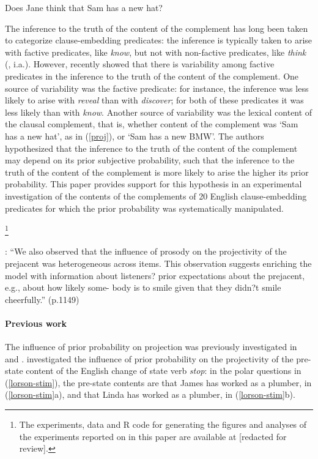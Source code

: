 \documentclass[11pt,fleqn]{article}
\newcommand{\6}{\mbox{$[\hspace*{-.6mm}[$}}
\newcommand{\9}{\mbox{$]\hspace*{-.6mm}]$}}
\begin{document}
\begin{exe}
\ex\label{proj2} Does Jane think that Sam has a new hat?
\end{exe}
The inference to the truth of the content of the complement has long been taken to categorize clause-embedding predicates: the inference is typically taken to arise with factive predicates, like {\em know}, but not with non-factive predicates, like {\em think} (\citealt{kiparsky-kiparsky70,karttunen71b}, i.a.). However, \citealt*{tbd-variability} recently showed that there is variability among factive predicates in the inference to the truth of the content of the complement. One source of variability was the factive predicate: for instance, the inference was less likely to arise with {\em reveal} than with {\em discover}; for both of these predicates it was less likely than with {\em know}. Another source of variability was the lexical content of the clausal complement, that is, whether content of the complement was `Sam has a new hat', as in (\ref{proj}), or `Sam has a new BMW'. The authors hypothesized that the inference to the truth of the content of the complement may depend on its prior subjective probability, such that the inference to the truth of the content of the complement is more likely to arise the higher its prior probability. This paper provides support for this hypothesis in an experimental investigation of the contents of the complements of 20 English clause-embedding predicates for which the prior probability was systematically manipulated. 

\footnote{\label{f-github}The experiments, data and R code for generating the figures and analyses of the experiments reported on in this paper are available at [redacted for review].}

\citealt{stevens-etal2017}: ``We also observed that the influence of prosody on the projectivity of the prejacent was heterogeneous across items. This observation suggests enriching the model with information about listeners? prior expectations about the prejacent, e.g., about how likely some- body is to smile given that they didn?t smile cheerfully.'' (p.1149)

\newpage

\paragraph{Previous work} The influence of prior probability on projection was previously investigated in \citealt{lorson2018} and \citealt{mahler2020}. \citet{lorson2018} investigated the influence of prior probability on the projectivity of the pre-state content of the English change of state verb {\em stop}: in the polar questions in (\ref{lorson-stim}), the pre-state contents are that James has worked as a plumber, in (\ref{lorson-stim}a), and that Linda has worked as a plumber, in (\ref{lorson-stim}b).
\end{document}
